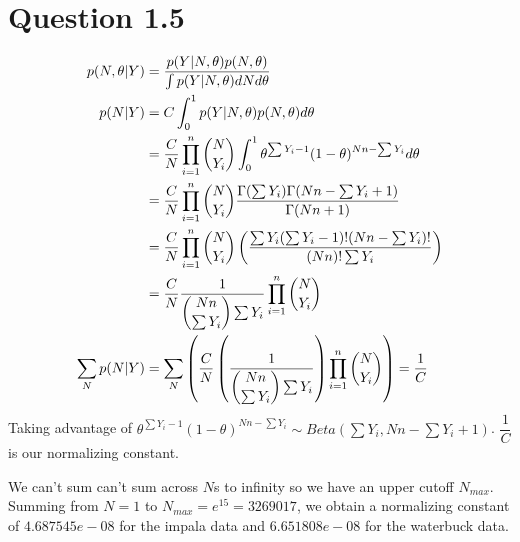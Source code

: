 \documentclass[10pt]{article}
\begin{document}
\section{Question 1.5}
\begin{align*}
p(N,\theta|Y) &= \dfrac{p(Y|N,\theta)p(N,\theta)}{\int p(Y|N,\theta)dNd\theta}\\
p(N|Y) &= C\int_0^1 p(Y|N,\theta)p(N, \theta)d\theta\\
&=\dfrac{C}{N}\prod_{i=1}^n\dbinom{N}{Y_i}\int_0^1\theta^{\sum{Y_i}-1}(1-\theta)^{Nn-\sum Y_i}d\theta\\
&=\dfrac{C}{N}\prod_{i=1}^n\dbinom{N}{Y_i}\dfrac{\Gamma(\sum{Y_i})\Gamma(Nn-\sum Y_i+1)}{\Gamma(Nn+1)}\\
&=\dfrac{C}{N}\prod_{i=1}^n\dbinom{N}{Y_i}\left(\dfrac{\sum Y_i (\sum Y_i - 1)! (Nn - \sum Y_i)!}{(Nn)!\sum Y_i}\right)\\
&=\dfrac{C}{N}\dfrac{1}{\dbinom{Nn}{\sum Y_i} \sum Y_i}\prod_{i=1}^n\dbinom{N}{Y_i}\\
\sum_N p(N|Y) &= \sum_N\left( \dfrac{C}{N}\left(\dfrac{1}{\dbinom{Nn}{\sum Y_i} \sum Y_i}\right)\prod_{i=1}^n\dbinom{N}{Y_i}\right) = \dfrac{1}{C}
\end{align*}
Taking advantage of  $\theta^{\sum{Y_i}-1}(1-\theta)^{Nn-\sum Y_i}\sim Beta(\sum{Y_i},Nn-\sum Y_i+1)$.
$\dfrac{1}{C}$ is our normalizing constant.

We can't sum can't sum across $N$s to infinity so we have an upper cutoff $N_{max}$. Summing from $N=1$ to $N_{max}=e^{15} = 3269017$, we obtain a normalizing constant of $4.687545e-08$ for the impala data and $6.651808e-08$ for the waterbuck data.\\
\end{document}
